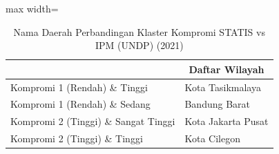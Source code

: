 \begin{table}[H]
\centering
\caption{Nama Daerah Perbandingan Klaster Kompromi STATIS vs IPM (UNDP) (2021)} \label{tab:sample1comp_ipm_name_2021}
\begin{adjustbox}{max width=\textwidth}
\begin{tabular}{|>{\centering\arraybackslash}p{4cm}|p{10cm}|}
\hline
\multicolumn{1}{|c|}{\textbf{Kategori}} & \multicolumn{1}{c|}{\textbf{Daftar Wilayah}} \\
\hline
Kompromi 1 (Rendah) \& Tinggi & Kota Tasikmalaya \\
\hline
Kompromi 1 (Rendah) \& Sedang & Bandung Barat \\
\hline
Kompromi 2 (Tinggi) \& Sangat Tinggi & Kota Jakarta Pusat \\
\hline
Kompromi 2 (Tinggi) \& Tinggi & Kota Cilegon \\
\hline
\end{tabular}
\end{adjustbox}
\end{table}